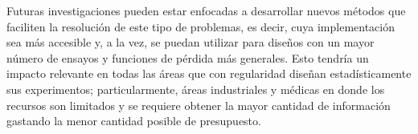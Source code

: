 Futuras investigaciones pueden estar enfocadas a desarrollar nuevos métodos que faciliten la resolución de este tipo de problemas, es decir, cuya implementación sea más accesible y, a la vez, se puedan utilizar para diseños con un mayor número de ensayos y funciones de pérdida más generales. Esto tendría un impacto relevante en todas las áreas que con regularidad diseñan estadísticamente sus experimentos; particularmente, áreas industriales y médicas en donde los recursos son limitados y se requiere obtener la mayor cantidad de información gastando la menor cantidad posible de presupuesto.





